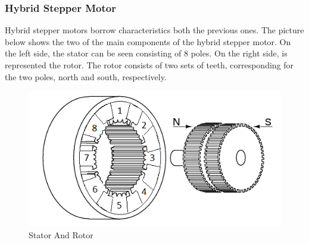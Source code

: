 \begin{figure}[htp] 
    \centering
    \hfill
    \hfill
  	\hfill
\end{figure}

\subsubsection{Hybrid Stepper Motor}
Hybrid stepper motors borrow characteristics both the previous ones. The picture below shows the two of the main components of the hybrid stepper motor. On the left side, the stator can be seen consisting of 8 poles. On the right side, is represented the rotor. The rotor consists of two sets of teeth, corresponding for the two poles, north and south, respectively.

\begin{figure}[h]
	\centering
	\includegraphics[width=\textwidth]{figures/move/motor27.png}
	\caption{Stator And Rotor}
\end{figure}


